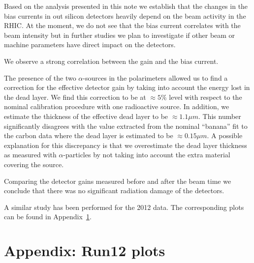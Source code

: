 \documentclass[a4paper,12pt]{article}
\begin{document}
Based on the analysis presented in this note we establish that the changes in
the bias currents in out silicon detectors heavily depend on the beam activity
in the RHIC. At the moment, we do not see that the bias current correlates with
the beam intensity but in further studies we plan to investigate if other beam
or machine parameters have direct impact on the detectors.

We observe a strong correlation between the gain and the bias current.

The presence of the two $\alpha$-sources in the polarimeters allowed us to find
a correction for the effective detector gain by taking into account the energy
lost in the dead layer. We find this correction to be at $\approx 5\%$ level
with respect to the nominal calibration procedure with one radioactive source.
In addition, we estimate the thickness of the effective dead layer to be
$\approx 1.1\mu m$. This number significantly disagrees with the value extracted
from the nominal ``banana'' fit to the carbon data where the dead layer is
estimated to be $\approx 0.15\mu m$. A possible explanation for this discrepancy
is that we overestimate the dead layer thickness as measured with
$\alpha$-particles by not taking into account the extra material covering the
source.

Comparing the detector gains measured before and after the beam time we conclude
that there was no significant radiation damage of the detectors.

A similar study has been performed for the 2012 data. The corresponding plots
can be found in Appendix~\ref{sec:appendix_run12}.


\clearpage
\appendix
\section{Appendix: Run12 plots}
\label{sec:appendix_run12}
\end{document}
